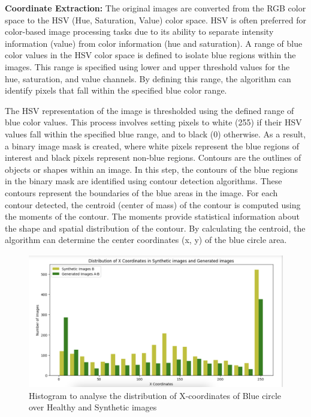 \documentclass[UKenglish,12pt]{master-style}
\begin{document}
\textbf{Coordinate Extraction: }The original images are converted from the RGB color space to the HSV (Hue, Saturation, Value) color space. HSV is often preferred for color-based image processing tasks due to its ability to separate intensity information (value) from color information (hue and saturation). A range of blue color values in the HSV color space is defined to isolate blue regions within the images. This range is specified using lower and upper threshold values for the hue, saturation, and value channels. By defining this range, the algorithm can identify pixels that fall within the specified blue color range.

The HSV representation of the image is thresholded using the defined range of blue color values. This process involves setting pixels to white (255) if their HSV values fall within the specified blue range, and to black (0) otherwise. As a result, a binary image mask is created, where white pixels represent the blue regions of interest and black pixels represent non-blue regions. Contours are the outlines of objects or shapes within an image. In this step, the contours of the blue regions in the binary mask are identified using contour detection algorithms. These contours represent the boundaries of the blue areas in the image. For each contour detected, the centroid (center of mass) of the contour is computed using the moments of the contour. The moments provide statistical information about the shape and spatial distribution of the contour. By calculating the centroid, the algorithm can determine the center coordinates (x, y) of the blue circle area.

\begin{figure}[htbp]
    \centering
    \includegraphics[width=1\textwidth]{Images/x_coordinates.png}
    \caption{Histogram to analyse the distribution of X-coordinates of Blue circle over Healthy and Synthetic images}
    \label{fig:x_coordinates}
\end{figure}
\end{document}
